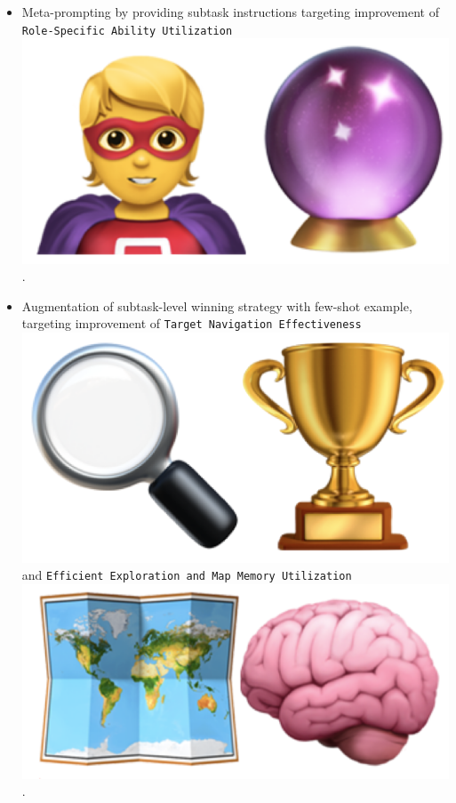 \begin{flushleft}
\begin{itemize}
    \item Meta-prompting by providing subtask instructions targeting improvement of \texttt{Role-Specific Ability Utilization} \includegraphics[scale=0.07]{figs/emojis/mini_6.png}.
    \item Augmentation of subtask-level winning strategy with few-shot example, targeting improvement of \texttt{Target Navigation Effectiveness} \includegraphics[scale=0.07]{figs/emojis/mini_1.png} and  \texttt{Efficient Exploration and Map Memory Utilization} \includegraphics[scale=0.07]{figs/emojis/mini_2.png}.
\end{itemize}


\end{flushleft}
